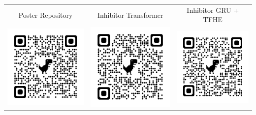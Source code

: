 \documentclass[12pt,oneside]{book}
\begin{document}
\begin{table}
    \centering
    \begin{tabular}{ccc}
        Poster Repository & 
        Inhibitor Transformer &
        Inhibitor GRU + TFHE\\
        \includegraphics[width=0.3\columnwidth]{qrcode_github.printposter.png} & 
        \includegraphics[width=0.3\columnwidth]{qrcode_arxiv.TheInhibitor.png} &
        \includegraphics[width=0.3\columnwidth]{qrcode_arxiv.iGRUforTFHE.png} \\
    \end{tabular}
\end{table}
 
\end{document}
